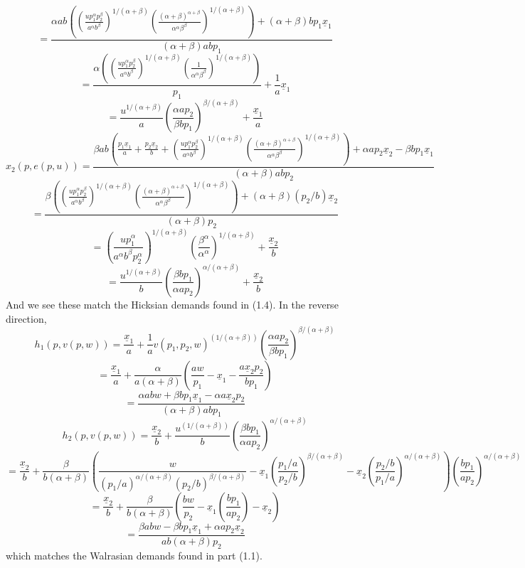 \documentclass[10pt,letter]{article}
\begin{document}
\[  = \frac{\alpha ab\left( \left( \frac{u p_1^{\alpha}p_2^{\beta}}{a^{\alpha}b^{\beta}} \right)^{1/(\alpha + \beta)} \left(  \frac{(\alpha + \beta)^{\alpha+\beta}}{\alpha^{\alpha}\beta^{\beta}} \right)^{1/(\alpha + \beta)} \right) + (\alpha + \beta) bp_1\underline{x}_1}{(\alpha + \beta) ab p_1} \]
\[  = \frac{\alpha \left( \left( \frac{u p_1^{\alpha}p_2^{\beta}}{a^{\alpha}b^{\beta}} \right)^{1/(\alpha + \beta)} \left(  \frac{1}{\alpha^{\alpha}\beta^{\beta}} \right)^{1/(\alpha + \beta)} \right) }{ p_1}+ \frac{1}{a}\underline{x}_1 \]
\[  =   \frac{u^{1/(\alpha + \beta) }}{a} \left(  \frac{\alpha a p_2}{\beta b p_1} \right)^{\beta/(\alpha + \beta)} + \frac{\underline{x}_1}{a} \]
\[ x_2(p,e(p,u)) = \frac{\beta ab \left( \frac{p_1\underline{x}_1}{a}+ \frac{p_2 \underline{x}_2}{b} + \left( \frac{u p_1^{\alpha}p_2^{\beta}}{a^{\alpha}b^{\beta}} \right)^{1/(\alpha + \beta)} \left(  \frac{(\alpha + \beta)^{\alpha+\beta}}{\alpha^{\alpha}\beta^{\beta}} \right)^{1/(\alpha + \beta)}\right) + \alpha ap_2 \underline{x}_2 - \beta bp_1\underline{x}_1}{(\alpha+\beta) a bp_2}  \]
\[= \frac{\beta \left( \left( \frac{u p_1^{\alpha}p_2^{\beta}}{a^{\alpha}b^{\beta}} \right)^{1/(\alpha + \beta)} \left(  \frac{(\alpha + \beta)^{\alpha+\beta}}{\alpha^{\alpha}\beta^{\beta}} \right)^{1/(\alpha + \beta)}\right) + (\alpha+\beta) (p_2/b) \underline{x}_2 }{(\alpha+\beta) p_2} \]
\[= \left( \frac{u p_1^{\alpha}}{a^{\alpha}b^{\beta}p_2^\alpha} \right)^{1/(\alpha + \beta)} \left(  \frac{\beta^{\alpha}}{\alpha^{\alpha}} \right)^{1/(\alpha + \beta)} + \frac{\underline{x}_2}{b} \]
\[= \frac{u^{1/(\alpha + \beta)} }{b}  \left(  \frac{\beta b p_1}{\alpha a p_2} \right)^{\alpha/(\alpha + \beta)} + \frac{\underline{x}_2}{b} \]
And we see these match the Hicksian demands found in (1.4). In the reverse direction,
\[ h_1(p, v(p,w)) = \frac{\underline{x}_1}{a} + \frac{1}{a}v(p_1,p_2,w)^{(1/(\alpha+\beta))} \left(\frac{\alpha a p_2}{\beta b p_1}\right)^{\beta/(\alpha+\beta)} \]
\[ = \frac{\underline{x}_1}{a} +\frac{\alpha}{a(\alpha+\beta)}\left(\frac{aw}{p_1} - \underline{x}_1 -  \frac{a\underline{x}_2p_2}{bp_1} \right)  \]
\[ = \frac{\alpha abw + \beta bp_1\underline{x}_1 -  \alpha a\underline{x}_2p_2 }{(\alpha+\beta)abp_1}  \]
\[ h_2(p,v(p,w)) = \frac{\underline{x}_2}{b} + \frac{u^{(1/(\alpha+\beta))}}{b} \left(\frac{\beta b p_1}{\alpha a p_2}\right)^{\alpha/(\alpha + \beta)} \]
\[= \frac{\underline{x}_2}{b} + \frac{ \beta}{b(\alpha+\beta)}\left(\frac{w}{(p_1/a)^{\alpha/(\alpha+\beta)}(p_2/b)^{\beta/(\alpha+\beta)}} - \underline{x}_1\left(\frac{p_1/a}{p_2/b}\right)^{\beta/(\alpha+\beta)}- \underline{x}_2 \left(\frac{p_2/b}{p_1/a}\right)^{\alpha/(\alpha+\beta)} \right) \left(\frac{b p_1}{a p_2}\right)^{\alpha/(\alpha + \beta)} \]
\[= \frac{\underline{x}_2}{b} + \frac{ \beta}{b(\alpha+\beta)}\left(\frac{bw}{p_2} - \underline{x}_1\left(\frac{bp_1}{ap_2}\right)- \underline{x}_2  \right) \]
\[= \frac{\beta abw - \beta bp_1 \underline{x}_1 + \alpha ap_2\underline{x}_2 }{ab(\alpha+\beta)p_2}\]
which matches the Walrasian demands found in part (1.1).
\end{document}
